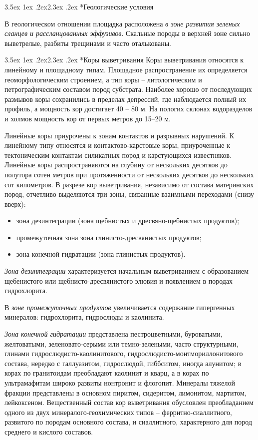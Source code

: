 \documentclass[a4paper,12pt]{article} %
\makeatletter
\renewcommand\subsection{\@startsection {subsection}{1}{\parindent}%
	{3.5ex \@plus 1ex \@minus .2ex}{2.3ex \@plus.2ex}%
	{\normalfont\hyphenpenalty=10000\large\bfseries}}
\def\txtGeology{
В геологическом  отношении площадка  расположена  \textit{в зоне развития зеленых сланцев и рассланцованных эффузивов}. Скальные породы в верхней зоне сильно выветрелые, разбиты трещинами и  часто оталькованы.
}
\makeatother
\begin{document}
\subsection*{Геологические условия}
\txtGeology

\subsection*{Коры выветривания}
Коры выветривания относятся к линейному и площадному типам. Площадное распространение их определяется геоморфологическим строением, а тип коры – литологическим и петрографическим составом пород субстрата. Наиболее хорошо от последующих размывов коры сохранились в пределах депрессий, где наблюдается полный их профиль, а  мощность кор достигает 40 – 80 м. На пологих склонах водоразделов и холмов мощность кор от первых метров до 15–20 м.

Линейные коры приурочены к зонам контактов и разрывных нарушений. К линейному типу относятся и контактово-карстовые коры, приуроченные к тектоническим контактам силикатных пород и карстующихся
известняков. Линейные коры распространяются на глубину от нескольких десятков до полутора сотен метров при протяженности от нескольких десятков до нескольких сот километров. В разрезе кор выветривания, независимо от состава материнских пород, отчетливо выделяются три зоны, связанные взаимными переходами (снизу вверх): 
\begin{itemize}
\item зона дезинтеграции (зона щебнистых и дресвяно-щебнистых продуктов);
\item промежуточная зона зона глинисто-дресвянистых продуктов;
\item зона конечной гидратации (зона глинистых продуктов).
\end{itemize}


\textit{Зона дезинтеграции} характеризуется начальным выветриванием с образованием щебенистого или щебнисто-дресвянистого элювия и появлением в породах гидрохлорита. 

В \textit{зоне промежуточных продуктов} увеличивается содержание гипергенных минералов: гидрохлорита, гидрослюды и каолинита. 

\textit{Зона конечной гидратации} представлена пестроцветными, буроватыми, желтоватыми, зеленовато-серыми или темно-зелеными, часто структурными, глинами гидро\-слюдисто-каолинитового, гидрослюдисто-монтмориллонитового состава, нередко с галлуазитом, гидрослюдой, гиббситом, иногда алунитом; в корах по гранитоидам преобладают каолинит и кварц, а в корах по ультрамафитам широко развиты нонтронит и флогопит. Минералы тяжелой фракции представлены в основном пиритом, сидеритом, лимонитом, мартитом, лейкоксеном. Вещественный состав кор выветривания обусловлен преобладанием одного из двух минералого-геохимических типов – ферритно-сиаллитного, развитого по породам основного состава, и сиаллитного, характерного для пород среднего и кислого составов.
\end{document}
